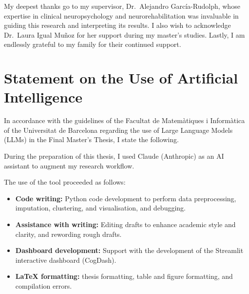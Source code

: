 \documentclass[
11pt, %
english, %
onehalfspacing, %
headsepline, %
]{MastersDoctoralThesis} %
\begin{document}

\begin{acknowledgements}
\addchaptertocentry{\acknowledgementname} %
My deepest thanks go to my supervisor, Dr.\ Alejandro Garc\'ia-Rudolph, whose expertise in clinical neuropsychology and neurorehabilitation was invaluable in guiding this research and interpreting its results. I also wish to acknowledge Dr.\ Laura Igual Mu\~noz for her support during my master's studies. Lastly, I am endlessly grateful to my family for their continued support.
\end{acknowledgements}


\newpage
\chapter*{Statement on the Use of Artificial Intelligence}

In accordance with the guidelines of the Facultat de Matem\`{a}tiques i Inform\`{a}tica of the Universitat de Barcelona regarding the use of Large Language Models (LLMs) in the Final Master's Thesis, I state the following.

During the preparation of this thesis, I used Claude (Anthropic) as an AI assistant to augment my research workflow.

The use of the tool proceeded as follows:

\begin{itemize}
    \item \textbf{Code writing:} Python code development to perform data preprocessing, imputation, clustering, and visualisation, and debugging.
    \item \textbf{Assistance with writing:} Editing drafts to enhance academic style and clarity, and rewording rough drafts.
    \item \textbf{Dashboard development:} Support with the development of the Streamlit interactive dashboard (CogDash).
    \item \textbf{LaTeX formatting:} thesis formatting, table and figure formatting, and compilation errors.
\end{itemize}
\end{document}
